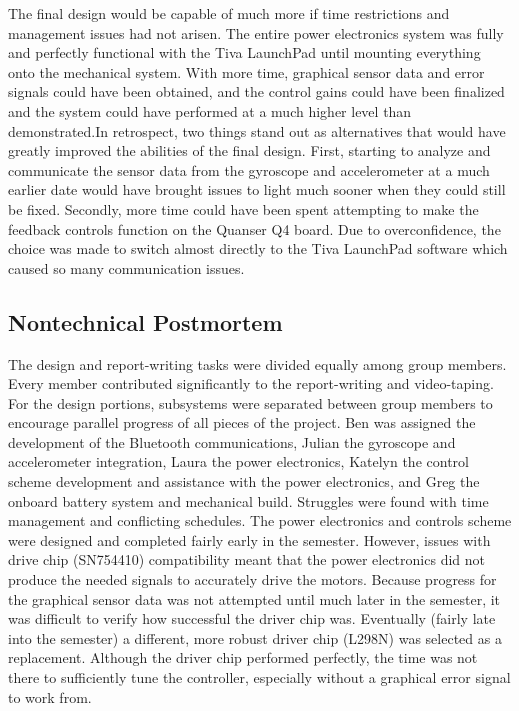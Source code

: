 \documentclass[11pt]{report}
\begin{document}
\begin{spacing}{1.5}
    The final design would be capable of much more if time restrictions and management issues had not arisen. The entire power electronics system was fully and perfectly functional with the Tiva LaunchPad until mounting everything onto the mechanical system. With more time, graphical sensor data and error signals could have been obtained, and the control gains could have been finalized and the system could have performed at a much higher level than demonstrated.In retrospect, two things stand out as alternatives that would have greatly improved the abilities of the final design. First, starting to analyze and communicate the sensor data from the gyroscope and accelerometer at a much earlier date would have brought issues to light much sooner when they could still be fixed. Secondly, more time could have been spent attempting to make the feedback controls function on the Quanser Q4 board. Due to overconfidence, the choice was made to switch almost directly to the Tiva LaunchPad software which caused so many communication issues. 
    
    \subsection*{Nontechnical Postmortem}
    
    The design and report-writing tasks were divided equally among group members. Every member contributed significantly to the report-writing and video-taping. For the design portions, subsystems were separated between group members to encourage parallel progress of all pieces of the project. Ben was assigned the development of the Bluetooth communications, Julian the gyroscope and accelerometer integration, Laura the power electronics, Katelyn the control scheme development and assistance with the power electronics, and Greg the onboard battery system and mechanical build. Struggles were found with time management and conflicting schedules. The power electronics and controls scheme were designed and completed fairly early in the semester. However, issues with drive chip (SN754410) compatibility meant that the power electronics did not produce the needed signals to accurately drive the motors. Because progress for the graphical sensor data was not attempted until much later in the semester, it was difficult to verify how successful the driver chip was. Eventually (fairly late into the semester) a different, more robust driver chip (L298N) was selected as a replacement. Although the driver chip performed perfectly, the time was not there to sufficiently tune the controller, especially without a graphical error signal to work from. 
    

\end{spacing}
\end{document}

